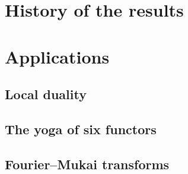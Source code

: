 \documentclass[10pt,a4paper]{article}
\begin{document}
\section{History of the results}
\label{section:history}


\section{Applications}
\label{section:applications-grothendieck-duality}
\subsection{Local duality}
\label{subsection:local-duality}

\subsection{The yoga of six functors}
\label{subsection:six-functors-yoga}

\subsection{Fourier--Mukai transforms}
\label{subsection:fourier-mukai-transforms}




\printbibliography
\end{document}
